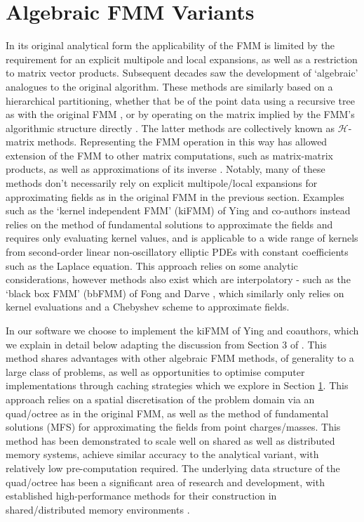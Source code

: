 \section{Algebraic FMM Variants}\label{chpt:2:sec:1}

In its original analytical form the applicability of the FMM is limited by the requirement for an explicit multipole and local expansions, as well as a restriction to matrix vector products. Subsequent decades saw the development of `algebraic' analogues to the original algorithm. These methods are similarly based on a hierarchical partitioning, whether that be of the point data using a recursive tree as with the original FMM \cite{Ying:2004:JCP,fong2009black}, or by operating on the matrix implied by the FMM's algorithmic structure directly \cite{hackbusch1999sparse,borm2003introduction,chandrasekaran2007fast}. The latter methods are collectively known as $\mathcal{H}$-matrix methods. Representing the FMM operation in this way has allowed extension of the FMM to other matrix computations, such as matrix-matrix products, as well as approximations of its inverse \cite{ambikasaran2014inverse}. Notably, many of these methods don't necessarily rely on explicit multipole/local expansions for approximating fields as in the original FMM in the previous section. Examples such as the `kernel independent FMM' (kiFMM) of Ying and co-authors instead relies on the method of fundamental solutions to approximate the fields and requires only evaluating kernel values, and is applicable to a wide range of kernels from second-order linear non-oscillatory elliptic PDEs with constant coefficients such as the Laplace equation. This approach relies on some analytic considerations, however methods also exist which are interpolatory - such as the `black box FMM' (bbFMM) of Fong and Darve \cite{fong2009black}, which similarly only relies on kernel evaluations and a Chebyshev scheme to approximate fields.

In our software we choose to implement the kiFMM of Ying and coauthors, which we explain in detail below adapting the discussion from Section 3 of \cite{Ying:2004:JCP}. This method shares advantages with other algebraic FMM methods, of generality to a large class of problems, as well as opportunities to optimise computer implementations through caching strategies which we explore in Section \ref{chpt:2:sec:1}. This approach relies on a spatial discretisation of the problem domain via an quad/octree as in the original FMM, as well as the method of fundamental solutions (MFS) for approximating the fields from point charges/masses. This method has been demonstrated to scale well on shared \cite{wang2021exafmm} as well as distributed memory \cite{malhotra2015pvfmm} systems, achieve similar accuracy to the analytical variant, with relatively low pre-computation required. The underlying data structure of the quad/octree has been a significant area of research and development, with established high-performance methods for their construction in shared/distributed memory environments \cite{sundar2008bottom,sundar2013hyksort,BursteddeWilcoxGhattas11}.

